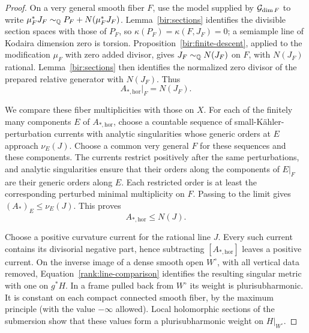 \begin{proof}
On a very general smooth fiber \(F\), use the model supplied by
\(\mathcal G_{\dim F}\) to write
\(\mu_F^*J_F\sim_{\mathbb Q}P_F+N(\mu_F^*J_F)\).
Lemma~\ref{bir:sections} identifies the divisible section spaces with
those of \(P_F\), so \(\kappa(P_F)=\kappa(F,J_F)=0\); a semiample line of Kodaira
dimension zero is torsion.  Proposition~\ref{bir:finite-descent},
applied to the modification \(\mu_F\) with zero added divisor, gives
\(J_F\sim_{\mathbb Q}N(J_F)\) on \(F\), with \(N(J_F)\) rational.
Lemma~\ref{bir:sections} then identifies the normalized zero divisor of
the prepared relative generator with \(N(J_F)\).  Thus
\[
        A_{*,\mathrm{hor}}|_F=N(J_F).
\]

We compare these fiber multiplicities with those on \(X\).
For each of the finitely many components \(E\) of
\(A_{*,\mathrm{hor}}\), choose a countable sequence of
small-Kähler-perturbation currents with analytic singularities whose
generic orders at \(E\) approach \(\nu_E(J)\).  Choose a common very
general \(F\) for these sequences and these components.  The currents restrict
positively after the same perturbations, and analytic singularities
ensure that their orders along the components of \(E|_F\) are
their generic orders along \(E\).  Each restricted order is at
least the corresponding perturbed minimal multiplicity on \(F\).
Passing to the limit gives
\((A_*)_E\leq\nu_E(J)\).  This proves
\begin{equation}
                       A_{*,\mathrm{hor}}\leq N(J).
\label{rank:horizontal-negative}
\end{equation}

Choose a positive curvature current for the rational line \(J\).
Every such current contains its divisorial negative part, hence
subtracting \([A_{*,\mathrm{hor}}]\) leaves a positive current.
On the inverse image of a dense smooth open \(W^\circ\), with all
vertical data removed, Equation~\eqref{rank:line-comparison}
identifies the resulting singular metric with one on \(g^*H\).
In a frame pulled back from \(W^\circ\) its weight is plurisubharmonic.
It is constant on each compact connected smooth fiber, by the
maximum principle (with the value \(-\infty\) allowed).  Local
holomorphic sections of the submersion show that these values form
a plurisubharmonic weight on \(H|_{W^\circ}\).


\end{proof}
